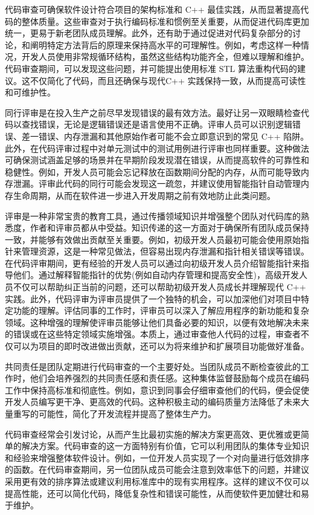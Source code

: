 代码审查可确保软件设计符合项目的架构标准和 C++ 最佳实践，从而显著提高代码的整体质量。这些审查对于执行编码标准和惯例至关重要，从而促进代码库更加统一，更易于新老团队成员理解。此外，还有助于通过促进对代码复杂部分的讨论，和阐明特定方法背后的原理来保持高水平的可理解性。例如，考虑这样一种情况，开发人员使用非常规循环结构，虽然这些结构功能齐全，但难以理解和维护。代码审查期间，可以发现这些问题，并可能提出使用标准 STL 算法重构代码的建议。这不仅简化了代码，而且还确保与现代C++ 实践保持一致，从而提高可读性和可维护性。

同行评审是在投入生产之前尽早发现错误的最有效方法。最好让另一双眼睛检查代码以查找错误，无论是逻辑错误还是语言使用不正确。评审人员可以识别逻辑错误、差一错误、内存泄漏和其他原始作者可能不会立即意识到的常见 C++ 陷阱。此外，在代码评审过程中对单元测试中的测试用例进行评审也同样重要。这种做法可确保测试涵盖足够的场景并在早期阶段发现潜在错误，从而提高软件的可靠性和稳健性。例如，开发人员可能会忘记释放在函数期间分配的内存，从而可能导致内存泄漏。评审此代码的同行可能会发现这一疏忽，并建议使用智能指针自动管理内存生命周期，从而在软件进一步进入开发周期之前有效地防止此类问题。

评审是一种非常宝贵的教育工具，通过传播领域知识并增强整个团队对代码库的熟悉度，作者和评审员都从中受益。知识传递的这一方面对于确保所有团队成员保持一致，并能够有效做出贡献至关重要。例如，初级开发人员最初可能会使用原始指针来管理资源，这是一种常见做法，但容易出现内存泄漏和指针相关错误等错误。在代码评审期间，更有经验的开发人员可以通过向初级开发人员介绍智能指针来指导他们。通过解释智能指针的优势(例如自动内存管理和提高安全性)，高级开发人员不仅可以帮助纠正当前的问题，还可以帮助初级开发人员成长并理解现代 C++ 实践。此外，代码评审为评审员提供了一个独特的机会，可以加深他们对项目中特定功能的理解。评估同事的工作时，评审员可以深入了解应用程序的新功能和复杂领域。这种增强的理解使评审员能够让他们具备必要的知识，以便有效地解决未来的错误或在这些特定领域实施增强。本质上，通过审查他人代码的过程，审查者不仅可以为项目的即时改进做出贡献，还可以为将来维护和扩展项目功能做好准备。

共同责任是团队定期进行代码审查的一个主要好处。当团队成员不断检查彼此的工作时，他们会培养强烈的共同责任感和责任感。这种集体监督鼓励每个成员在编码工作中保持高标准和彻底性。例如，意识到同事会仔细审查他们的代码，便会促使开发人员编写更干净、更高效的代码。这种积极主动的编码质量方法降低了未来大量重写的可能性，简化了开发流程并提高了整体生产力。

代码审查经常会引发讨论，从而产生比最初实施的解决方案更高效、更优雅或更简单的解决方案。代码审查的这一方面特别有价值，它可以利用团队的集体专业知识和经验来增强整体软件设计。例如，一位开发人员实现了一个对向量进行低效排序的函数。在代码审查期间，另一位团队成员可能会注意到效率低下的问题，并建议采用更有效的排序算法或建议利用标准库中的现有实用程序。这样的建议不仅可以提高性能，还可以简化代码，降低复杂性和错误可能性，从而使软件更加健壮和易于维护。


